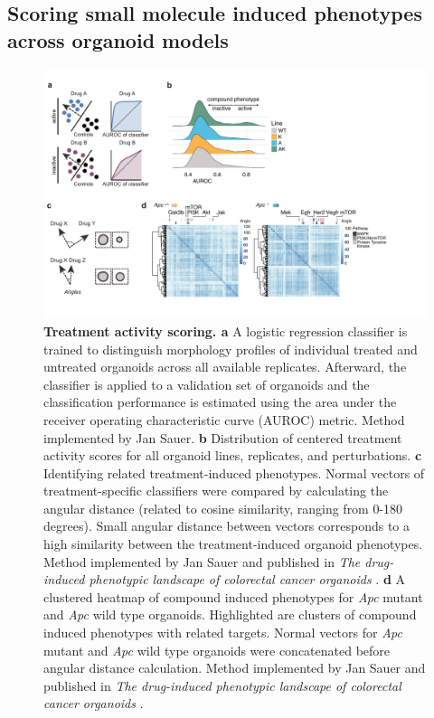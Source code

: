\begin{flushleft}
\clearpage
\subsection{Scoring small molecule induced phenotypes across organoid models}

\begin{figure}[h!]
\centering
\includegraphics[width=\textwidth,
                height=\textheight,
                keepaspectratio]{figures/adenomaprofiling/pdf/fig_1_5_2.pdf}
\caption[Treatment activity scoring]{\textbf{Treatment activity scoring. a} A logistic regression classifier is trained to distinguish morphology profiles of individual treated and untreated organoids across all available replicates. Afterward, the classifier is applied to a validation set of organoids and the classification performance is estimated using the area under the receiver operating characteristic curve (AUROC) metric. Method implemented by Jan Sauer.
\textbf{b} Distribution of centered treatment activity scores for all organoid lines, replicates, and perturbations. 
\textbf{c} Identifying related treatment-induced phenotypes. Normal vectors of treatment-specific classifiers were compared by calculating the angular distance (related to cosine similarity, ranging from 0-180 degrees). Small angular distance between vectors corresponds to a high similarity between the treatment-induced organoid phenotypes. Method implemented by Jan Sauer and published in \textit{The drug-induced phenotypic landscape of colorectal cancer organoids} \parencite{betgeDruginducedPhenotypicLandscape2022}.
\textbf{d} A clustered heatmap of compound induced phenotypes for \textit{Apc} mutant and \textit{Apc} wild type organoids. Highlighted are clusters of compound induced phenotypes with related targets. Normal vectors for \textit{Apc} mutant and \textit{Apc} wild type organoids were concatenated before angular distance calculation. Method implemented by Jan Sauer and published in \textit{The drug-induced phenotypic landscape of colorectal cancer organoids} \parencite{betgeDruginducedPhenotypicLandscape2022}.
}
\label{fig_150}
\end{figure}
\bigbreak


\end{flushleft}
